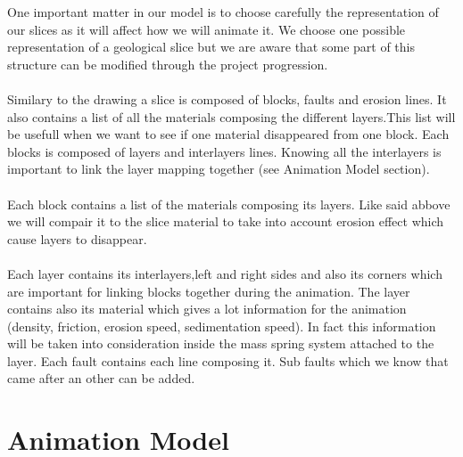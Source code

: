 \documentclass[12pt, a4paper]{memoir} %
\begin{document}
One important matter in our model is to choose carefully the representation of our slices as it will affect how we will animate it.
We choose one possible representation of a geological slice but we are aware that some part of this structure can be modified through the project progression.\\\\
Similary to the drawing a slice is composed of blocks, faults and erosion lines. It also contains a list of all the materials composing the different layers.This list will be usefull when we want to see if one material disappeared from one block. Each blocks is composed of layers and interlayers lines. Knowing all the interlayers is important to link the layer mapping together (see Animation Model section).\\\\
Each block contains a list of the materials composing its layers. Like said abbove we will compair it to the slice material to take into account erosion effect which cause layers to disappear. \\\\
Each layer contains its interlayers,left and right sides and also its corners which are important for linking blocks together during the animation. The layer contains also its material which gives a lot information for the animation (density, friction, erosion speed, sedimentation speed). 
In fact this information will be taken into consideration inside the mass spring system attached to the layer.
Each fault contains each line composing it. Sub faults which we know that came after an other can be added.


\section{Animation Model}
\end{document}
